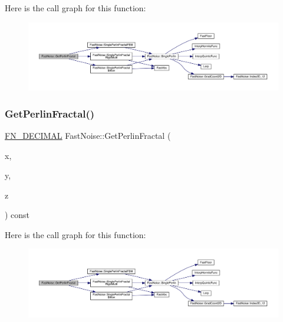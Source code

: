 Here is the call graph for this function\+:
\nopagebreak
\begin{figure}[H]
\begin{center}
\leavevmode
\includegraphics[width=350pt]{d1/dd8/class_fast_noise_adc266f882b7128f39770bc79eae6b872_cgraph}
\end{center}
\end{figure}
\mbox{\label{class_fast_noise_a6f4a364104bbc65cda5135a904737de9}} 
\subsubsection{\texorpdfstring{Get\+Perlin\+Fractal()}{GetPerlinFractal()}\hspace{0.1cm}{\footnotesize\ttfamily [2/2]}}
{\footnotesize\ttfamily \mbox{\hyperlink{_fast_noise_8h_a75a9ef6d2541c4921815b885bfd449c3}{F\+N\+\_\+\+D\+E\+C\+I\+M\+AL}} Fast\+Noise\+::\+Get\+Perlin\+Fractal (\begin{DoxyParamCaption}\item[{\mbox{\hyperlink{_fast_noise_8h_a75a9ef6d2541c4921815b885bfd449c3}{F\+N\+\_\+\+D\+E\+C\+I\+M\+AL}}}]{x,  }\item[{\mbox{\hyperlink{_fast_noise_8h_a75a9ef6d2541c4921815b885bfd449c3}{F\+N\+\_\+\+D\+E\+C\+I\+M\+AL}}}]{y,  }\item[{\mbox{\hyperlink{_fast_noise_8h_a75a9ef6d2541c4921815b885bfd449c3}{F\+N\+\_\+\+D\+E\+C\+I\+M\+AL}}}]{z }\end{DoxyParamCaption}) const}

Here is the call graph for this function\+:
\nopagebreak
\begin{figure}[H]
\begin{center}
\leavevmode
\includegraphics[width=350pt]{d1/dd8/class_fast_noise_a6f4a364104bbc65cda5135a904737de9_cgraph}
\end{center}
\end{figure}
\mbox{\label{class_fast_noise_ade53a483f6d63837f5be13867190363a}} 
